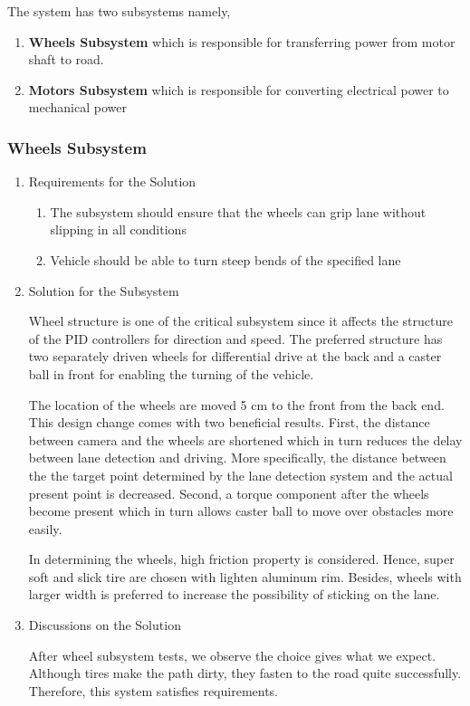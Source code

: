 \documentclass[a4paper,12pt]{article}
\begin{document}
	
	The system has two subsystems namely,

	\begin{enumerate}
		\item \textbf{Wheels Subsystem} which is responsible for transferring power from motor shaft to road.
		\item \textbf{Motors Subsystem} which is responsible for converting electrical power to mechanical power
	\end{enumerate}


	\subsubsection{Wheels Subsystem}
		\begin{enumerate}
			\item {Requirements for the Solution}
			
			\begin{enumerate}
				\item The subsystem should ensure that the wheels can grip lane without slipping in all conditions
				\item Vehicle should be able to turn steep bends of the specified lane
			\end{enumerate}


	\item {Solution for the Subsystem}
	
	Wheel structure is one of the critical subsystem since it affects the structure of the PID controllers for direction and speed. The preferred structure has two separately driven wheels for differential drive at the back and a caster ball in front for enabling the turning of the vehicle.  
	
	The location of the wheels are moved 5 cm to the front from the back end. This design change comes with two beneficial results. First, the distance between camera and the wheels are shortened which in turn reduces the delay between lane detection and driving. More specifically, the distance between the the target point determined by the lane detection system and the actual present point is decreased. Second, a torque component after the wheels become present which in turn allows caster ball to move over obstacles more easily.
	
	In determining the wheels, high friction property is considered. Hence, super soft and slick tire are chosen with lighten aluminum rim. Besides, wheels with larger width is preferred to increase the possibility of sticking on the lane.      


	\item {Discussions on the Solution}
	
	After wheel subsystem tests, we observe the choice gives what we expect. Although tires make the path dirty, they fasten to the road quite successfully. Therefore, this system satisfies requirements.

	\end{enumerate}
\end{document}

